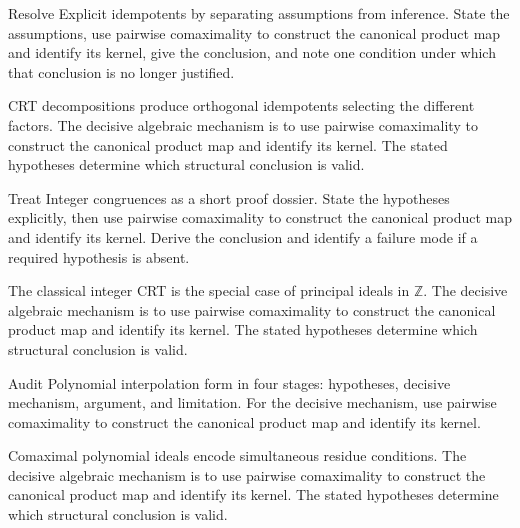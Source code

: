 \begin{problem}\label{prob:v04-problem-05}
Resolve Explicit idempotents by separating assumptions from inference. State the assumptions, use pairwise comaximality to construct the canonical product map and identify its kernel, give the conclusion, and note one condition under which that conclusion is no longer justified.
\end{problem}
\begin{solution}
CRT decompositions produce orthogonal idempotents selecting the different factors. The decisive algebraic mechanism is to use pairwise comaximality to construct the canonical product map and identify its kernel. The stated hypotheses determine which structural conclusion is valid.
\end{solution}

\begin{problem}\label{prob:v04-problem-06}
Treat Integer congruences as a short proof dossier. State the hypotheses explicitly, then use pairwise comaximality to construct the canonical product map and identify its kernel. Derive the conclusion and identify a failure mode if a required hypothesis is absent.
\end{problem}
\begin{solution}
The classical integer CRT is the special case of principal ideals in $\mathbb Z$. The decisive algebraic mechanism is to use pairwise comaximality to construct the canonical product map and identify its kernel. The stated hypotheses determine which structural conclusion is valid.
\end{solution}

\begin{problem}\label{prob:v04-problem-07}
Audit Polynomial interpolation form in four stages: hypotheses, decisive mechanism, argument, and limitation. For the decisive mechanism, use pairwise comaximality to construct the canonical product map and identify its kernel.
\end{problem}
\begin{solution}
Comaximal polynomial ideals encode simultaneous residue conditions. The decisive algebraic mechanism is to use pairwise comaximality to construct the canonical product map and identify its kernel. The stated hypotheses determine which structural conclusion is valid.
\end{solution}

